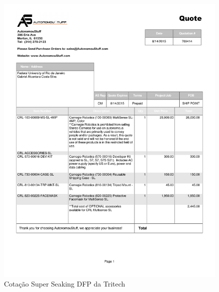 \documentclass{article}
\begin{document}
\begin{figure}[H]
 \centering
 \includegraphics[page=2,width=1\columnwidth]{figs/forecast/quote2.pdf}
 \caption{Cotação Super Seaking DFP da Tritech}
\end{figure}


\newpage
\end{document}
